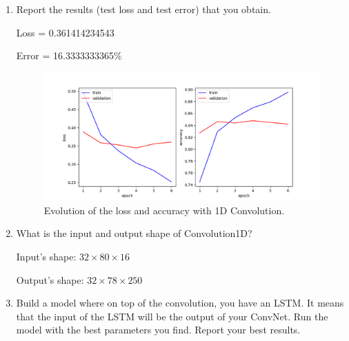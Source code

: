 \documentclass{article} %
\begin{document}
\begin{enumerate}
    \item
    Report the results (test loss and test error) that you obtain.

    Loss = 0.361414234543

    Error = 16.3333333365\%

    \begin{figure}[ht]
    \includegraphics[width=\textwidth,height=\textheight,keepaspectratio]{img/cnn_loss_acc.png}
    \caption{Evolution of the loss and accuracy with 1D Convolution.}
    \end{figure}

    \item
    What is the input and output shape of Convolution1D?

    Input's shape: $32 \times 80 \times 16$

    Output's shape: $32 \times 78 \times 250$

    \item
    Build a model where on top of the convolution, you have an LSTM. It means
    that the input of the LSTM will be the output of your ConvNet. Run the model
    with the best parameters you find. Report your best results.


\end{enumerate}



\end{document}
